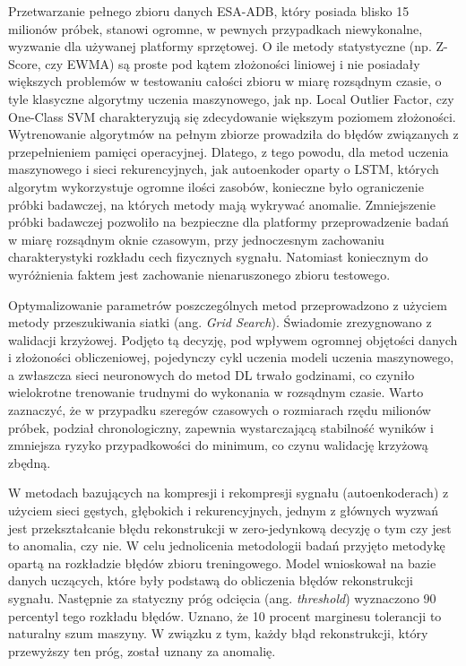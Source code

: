 \documentclass[a4paper,twoside,12pt]{book}
\newcommand{\obcy}[1]{\emph{#1}}
\newcommand{\english}[1]{{\selectlanguage{british}\obcy{#1}}}
\begin{document}
	Przetwarzanie pełnego zbioru danych ESA-ADB, który posiada blisko 15 milionów próbek, stanowi ogromne, w pewnych przypadkach niewykonalne, wyzwanie dla używanej platformy sprzętowej. O ile metody statystyczne (np. Z-Score, czy EWMA) są proste pod kątem złożoności liniowej i nie posiadały większych problemów w testowaniu całości zbioru w miarę rozsądnym czasie, o tyle klasyczne algorytmy uczenia maszynowego, jak np. Local Outlier Factor, czy One-Class SVM charakteryzują się zdecydowanie większym poziomem złożoności. Wytrenowanie algorytmów na pełnym zbiorze prowadziła do błędów związanych z przepełnieniem pamięci operacyjnej. Dlatego, z tego powodu, dla metod uczenia maszynowego i sieci rekurencyjnych, jak autoenkoder oparty o LSTM, których algorytm wykorzystuje ogromne ilości zasobów, konieczne było ograniczenie próbki badawczej, na których metody mają wykrywać anomalie. Zmniejszenie próbki badawczej pozwoliło na bezpieczne dla platformy przeprowadzenie badań w miarę rozsądnym oknie czasowym, przy jednoczesnym zachowaniu charakterystyki rozkładu cech fizycznych sygnału. Natomiast koniecznym do wyróżnienia faktem jest zachowanie nienaruszonego zbioru testowego. 
	
	Optymalizowanie parametrów poszczególnych metod przeprowadzono z użyciem metody przeszukiwania siatki (ang. \english{Grid Search}). Świadomie zrezygnowano z walidacji krzyżowej. Podjęto tą decyzję, pod wpływem ogromnej objętości danych i złożoności obliczeniowej, pojedynczy cykl uczenia modeli uczenia maszynowego, a zwłaszcza sieci neuronowych do metod DL trwało godzinami, co czyniło wielokrotne trenowanie trudnymi do wykonania w rozsądnym czasie. Warto zaznaczyć, że w  przypadku szeregów czasowych o rozmiarach rzędu milionów próbek, podział chronologiczny, zapewnia wystarczającą stabilność wyników i zmniejsza ryzyko przypadkowości do minimum, co czynu walidację krzyżową zbędną.
	
	W metodach bazujących na kompresji i rekompresji sygnału (autoenkoderach) z użyciem sieci gęstych, głębokich i rekurencyjnych, jednym z głównych wyzwań jest przekształcanie błędu rekonstrukcji w zero-jedynkową decyzję o tym czy jest to anomalia, czy nie. W celu jednolicenia metodologii badań przyjęto metodykę opartą na rozkładzie błędów zbioru treningowego. Model wnioskował na bazie danych uczących, które były podstawą do obliczenia błędów rekonstrukcji sygnału. Następnie za statyczny próg odcięcia (ang. \english{threshold}) wyznaczono 90 percentyl tego rozkładu błędów. Uznano, że 10 procent marginesu tolerancji to naturalny szum maszyny. W związku z tym, każdy błąd rekonstrukcji, który przewyższy ten próg, został uznany za anomalię.
	
\end{document}
